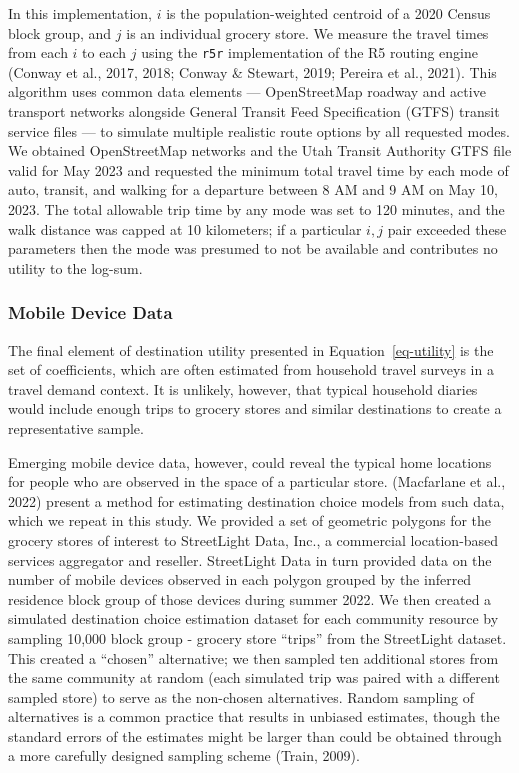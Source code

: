 \documentclass[
  letterpaper,
  number,
  review,
  3p]{elsarticle}
\begin{document}
In this implementation, \(i\) is the population-weighted centroid of a
2020 Census block group, and \(j\) is an individual grocery store. We
measure the travel times from each \(i\) to each \(j\) using the
\texttt{r5r} implementation of the R5 routing engine (Conway et al.,
2017, 2018; Conway \& Stewart, 2019; Pereira et al., 2021). This
algorithm uses common data elements --- OpenStreetMap roadway and active
transport networks alongside General Transit Feed Specification (GTFS)
transit service files --- to simulate multiple realistic route options
by all requested modes. We obtained OpenStreetMap networks and the Utah
Transit Authority GTFS file valid for May 2023 and requested the minimum
total travel time by each mode of auto, transit, and walking for a
departure between 8 AM and 9 AM on May 10, 2023. The total allowable
trip time by any mode was set to 120 minutes, and the walk distance was
capped at 10 kilometers; if a particular \(i,j\) pair exceeded these
parameters then the mode was presumed to not be available and
contributes no utility to the log-sum.

\subsubsection{Mobile Device Data}\label{mobile-device-data}

The final element of destination utility presented in
Equation~\ref{eq-utility} is the set of coefficients, which are often
estimated from household travel surveys in a travel demand context. It
is unlikely, however, that typical household diaries would include
enough trips to grocery stores and similar destinations to create a
representative sample.

Emerging mobile device data, however, could reveal the typical home
locations for people who are observed in the space of a particular
store. (Macfarlane et al., 2022) present a method for estimating
destination choice models from such data, which we repeat in this study.
We provided a set of geometric polygons for the grocery stores of
interest to StreetLight Data, Inc., a commercial location-based services
aggregator and reseller. StreetLight Data in turn provided data on the
number of mobile devices observed in each polygon grouped by the
inferred residence block group of those devices during summer 2022. We
then created a simulated destination choice estimation dataset for each
community resource by sampling 10,000 block group - grocery store
``trips'' from the StreetLight dataset. This created a ``chosen''
alternative; we then sampled ten additional stores from the same
community at random (each simulated trip was paired with a different
sampled store) to serve as the non-chosen alternatives. Random sampling
of alternatives is a common practice that results in unbiased estimates,
though the standard errors of the estimates might be larger than could
be obtained through a more carefully designed sampling scheme (Train,
2009).
\end{document}
